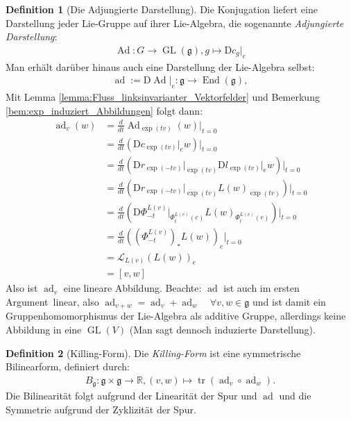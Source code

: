 \documentclass[a4paper]{scrreprt}
\numberwithin{equation}{chapter}
\newcommand{\DD}{\mathrm{D}}
\DeclareMathOperator{\GL}{GL}
\DeclareMathOperator{\End}{End}
\DeclareMathOperator{\Ad}{Ad}
\DeclareMathOperator{\ad}{ad}
\DeclareMathOperator{\tr}{tr}
\newcommand{\R}{\mathbb{R}}
\theoremstyle{definition}
\newtheorem{defn}{Definition}[section]
\begin{document}
		\begin{defn}[Die Adjungierte Darstellung]\hfill
		
			Die Konjugation liefert eine Darstellung jeder Lie-Gruppe auf ihrer Lie-Algebra, die sogenannte \emph{Adjungierte Darstellung}:
			\begin{align*}
				\Ad\colon G\rightarrow \GL(\mathfrak{g}), g\mapsto \DD c_g\vert_e
			\end{align*}
			Man erhält darüber hinaus auch eine Darstellung der Lie-Algebra selbst:
			\begin{align*}
				\ad:=\DD\Ad\vert_e\colon\mathfrak{g}\rightarrow\End(\mathfrak{g}),
			\end{align*}
			Mit Lemma \ref{lemma:Fluss_linksinvarianter_Vektorfelder} und Bemerkung \ref{bem:exp_induziert_Abbildungen} folgt dann:
			\begin{align*}
				\ad_v(w)&=\frac{d}{dt}\Ad_{\exp(tv)}(w)\Big\vert_{t=0}\\
				&=\frac{d}{dt}\left(\DD c_{\exp(tv)}\vert_e w\right)\Big\vert_{t=0}\\
				&=\frac{d}{dt}\left(\DD r_{\exp(-tv)}\vert_{\exp(tv)}\DD l_{\exp(tv)}\vert_e w\right)\Big\vert_{t=0}\\
				&=\frac{d}{dt}\left(\DD r_{\exp(-tv)}\vert_{\exp(tv)}L(w)_{\exp(tv)}\right)\Big\vert_{t=0}\\
				&=\frac{d}{dt}\left(\DD \Phi_{-t}^{L(v)}\vert_{\Phi^{L(v)}_t(e)}L(w)_{\Phi^{L(v)}_t(e)}\right)\Big\vert_{t=0}\\
				&=\frac{d}{dt}\left(\left(\Phi_{-t}^{L(v)}\right)_*L(w)\right)_e\Big\vert_{t=0}\\
				&=\mathcal{L}_{L(v)}(L(w))_e\\
				&=\left[v,w\right]
			\end{align*}
			Also ist $\ad_v$ eine lineare Abbildung. Beachte: $\ad$ ist auch \glqq im ersten Argument\grqq\ linear, also $\ad_{v+w}=\ad_v+\ad_w \quad\forall v,w\in\mathfrak{g}$ und ist damit ein Gruppenhomomorphismus der Lie-Algebra als additive Gruppe, allerdings keine Abbildung in eine $\GL(V)$ (Man sagt dennoch \glqq induzierte Darstellung\grqq).
		\end{defn}
		\begin{defn}[Killing-Form]
			Die \emph{Killing-Form} ist eine symmetrische Bilinearform, definiert durch:
			\begin{align*}
				B_{\mathfrak{g}}\colon\mathfrak{g}\times\mathfrak{g}\rightarrow\R, (v,w)\mapsto \tr(\ad_v\circ\ad_w).
			\end{align*}
			Die Bilinearität folgt aufgrund der Linearität der Spur und $\ad$ und die Symmetrie aufgrund der Zyklizität der Spur.
		\end{defn}
\end{document}
